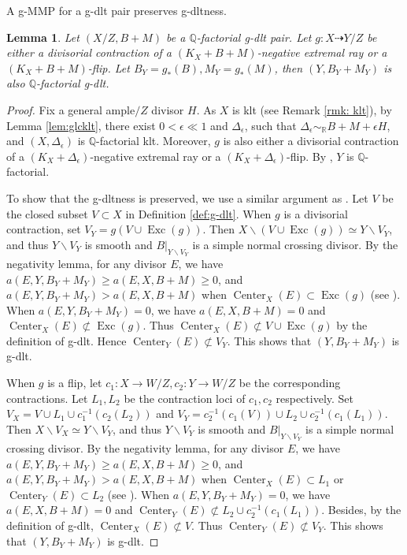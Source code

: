 \documentclass[11pt]{amsart}
\newcommand{\Rr}{\mathbb{R}}
\newcommand{\Qq}{\mathbb{Q}}
\newcommand{\Exc}{\operatorname{Exc}}
\newcommand{\Center}{\operatorname{Center}}
\newtheorem{lemma}[theorem]{Lemma}
\begin{document}
A g-MMP for a g-dlt pair preserves g-dltness. 
\begin{lemma}\label{lem:dltpreserved}
	Let $(X/Z,B+M)$ be a $\Qq$-factorial g-dlt pair. Let $g: X\dashrightarrow Y/Z$ be either a divisorial contraction of a $(K_X+B+M)$-negative extremal ray or a $(K_X+B+M)$-flip. Let $B_Y=g_{*}(B), M_Y=g_{*}(M)$, then $(Y,B_Y+M_Y)$ is also $\Qq$-factorial g-dlt.
\end{lemma}
\begin{proof}
	Fix a general ample$/Z$ divisor $H$. As $X$ is klt (see Remark \ref{rmk: klt}), by Lemma \ref{lem:glcklt}, there exist $0<\epsilon\ll 1$ and $\Delta_{\epsilon}$, such that $\Delta_{\epsilon}\sim_{\Rr} B+M+\epsilon H$, and $(X,\Delta_{\epsilon})$ is $\Qq$-factorial klt. Moreover, $g$ is also either a divisorial contraction of a $(K_X+\Delta_{\epsilon})$-negative extremal ray or a $(K_X+\Delta_{\epsilon})$-flip. By \cite[Proposition 3.36, 3.37]{KM98}, $Y$ is $\Qq$-factorial. 
	
To show that the g-dltness is preserved, we use a similar argument as \cite[Lemma 3.44]{KM98}. Let $V$ be the closed subset $V\subset X$ in Definition \ref{def:g-dlt}. When $g$ is a divisorial contraction, set $V_Y= g(V \cup \Exc(g))$. Then $X \backslash (V\cup \Exc(g)) \simeq Y \backslash V_Y$, and thus $Y\backslash V_Y$ is smooth and $B|_{Y\backslash V_Y}$ is a simple normal crossing divisor. By the negativity lemma, for any divisor $E$, we have $a(E, Y, B_Y+M_Y) \geq a(E, X, B+M) \geq 0$, and $a(E, Y, B_Y+M_Y)> a(E, X, B+M)$ when $\Center_X(E)\subset \Exc(g)$ (see \cite[Lemma 3.38]{KM98}). When $a(E, Y, B_Y+M_Y)=0$, we have $a(E, X, B+M)=0$ and $\Center_X(E)\not\subset \Exc(g)$. Thus $\Center_X(E) \not\subset V \cup \Exc(g)$ by the definition of g-dlt. Hence $\Center_Y(E) \not\subset V_Y$. This shows that $(Y, B_Y+M_Y)$ is g-dlt.
	
	When $g$ is a flip, let $c_1: X \to W/Z, c_2: Y \to W/Z$ be the corresponding contractions. Let $L_1, L_2$ be the contraction loci of $c_1, c_2$ respectively. Set $V_X = V \cup L_1 \cup c_1^{-1}(c_2(L_2))$ and $V_Y = c_2^{-1}(c_1(V)) \cup L_2 \cup c_2^{-1}(c_1(L_1))$. Then $X \backslash V_X \simeq Y \backslash V_Y$, and thus $Y\backslash V_Y$ is smooth and $B|_{Y\backslash V_Y}$ is a simple normal crossing divisor. By the negativity lemma, for any divisor $E$, we have $a(E, Y, B_Y+M_Y) \geq a(E, X, B+M) \geq 0$, and $a(E, Y, B_Y+M_Y)> a(E, X, B+M)$ when $\Center_X(E)\subset L_1$ or $\Center_Y(E)\subset L_2$ (see \cite[Lemma 3.38, 3.44]{KM98}). When $a(E, Y, B_Y+M_Y)=0$, we have $a(E, X, B+M)=0$ and $\Center_Y(E)\not\subset L_2 \cup c_2^{-1}(c_1(L_1))$. Besides, by the definition of g-dlt, $\Center_X(E) \not\subset V$. Thus $\Center_Y(E) \not\subset V_Y$. This shows that $(Y, B_Y+M_Y)$ is g-dlt.
\end{proof}
\end{document}
